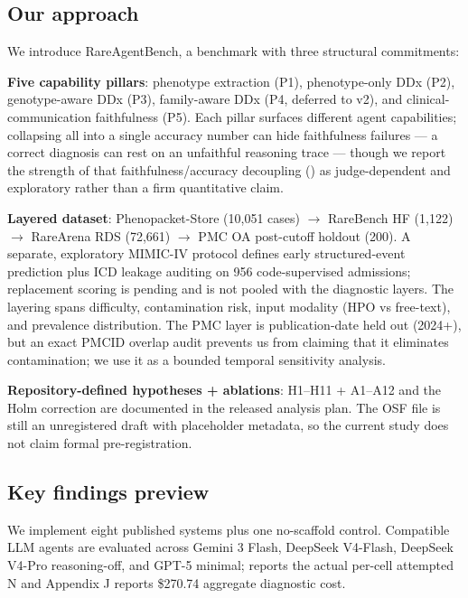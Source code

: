 \subsection{Our approach}\label{sec-2-4}

We introduce RareAgentBench, a benchmark with three structural commitments:

\textbf{Five capability pillars}: phenotype extraction (P1), phenotype-only
DDx (P2), genotype-aware DDx (P3), family-aware DDx (P4, deferred to
v2), and clinical-communication faithfulness (P5). Each pillar surfaces
different agent capabilities; collapsing all into a single accuracy
number can hide faithfulness failures --- a correct diagnosis can rest on an
unfaithful reasoning trace --- though we report the strength of that
faithfulness/accuracy decoupling () as judge-dependent and exploratory
rather than a firm quantitative claim.

\textbf{Layered dataset}: Phenopacket-Store (10,051 cases) \ensuremath{\rightarrow} RareBench HF
(1,122) \ensuremath{\rightarrow} RareArena RDS (72,661) \ensuremath{\rightarrow} PMC OA post-cutoff holdout (200).
A separate, exploratory MIMIC-IV protocol defines early structured-event
prediction plus ICD leakage auditing on 956 code-supervised admissions;
replacement scoring is pending and is not pooled with the diagnostic layers.
The layering spans difficulty, contamination risk, input
modality (HPO vs free-text), and prevalence
distribution. The PMC layer is publication-date held out (2024+), but an exact
PMCID overlap audit prevents us from claiming that it eliminates contamination;
we use it as a bounded temporal sensitivity analysis.

\textbf{Repository-defined hypotheses + ablations}: H1--H11 + A1--A12 and the
Holm correction are documented in the released analysis plan. The OSF file is
still an unregistered draft with placeholder metadata, so the current study
does not claim formal pre-registration.

\subsection{Key findings preview}\label{sec-2-5}

We implement eight published systems plus one no-scaffold control. Compatible
LLM agents are evaluated across Gemini 3 Flash, DeepSeek V4-Flash,
DeepSeek V4-Pro reasoning-off, and GPT-5 minimal;  reports the actual
per-cell attempted N and Appendix J reports \$270.74 aggregate diagnostic cost.

